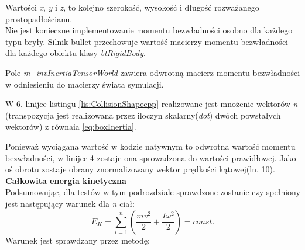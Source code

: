 Wartości \emph{x}, \emph{y} i \emph{z}, to kolejno szerokość, wysokość i długość
rozważanego prostopadłościanu.\\
Nie jest konieczne implementowanie momentu bezwładności osobno dla każdego typu
bryły. Silnik bullet przechowuje wartość macierzy momentu bezwładności dla
każdego obiektu klasy \emph{btRigidBody}.



Pole \emph{m\_invInertiaTensorWorld} zawiera odwrotną macierz momentu
bezwładności w odniesieniu do macierzy świata symulacji.



W 6. linijce listingu \ref{lis:CollisionShapecpp} realizowane jest mnożenie wektorów
\emph{n} (transpozycja jest realizowana przez iloczyn skalarny(\emph{dot}) dwóch
powstałych wektorów) z równaia \ref{eq:boxInertia}.



Ponieważ wyciągana wartość w kodzie natywnym to odwrotna wartość momentu
bezwładności, w linijce 4 zostaje ona sprowadzona do wartości prawidłowej. Jako
oś obrotu zostaje obrany znormalizowany wektor prędkości kątowej(ln. 10).\\
\textbf{Całkowita energia kinetyczna}\\
Podsumowując, dla testów w tym podrozdziale sprawdzone zostanie czy spełniony
jest następujący warunek dla \emph{n} ciał:
\begin{equation}
E_{K} = \sum_{i=1}^{n}\left(\frac{mv^{2}}{2} + \frac{I\omega^{2}}{2}\right) =
const.
\end{equation}
Warunek jest sprawdzany przez metodę:


